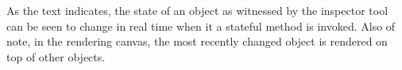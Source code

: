As the text indicates, the state of an object as witnessed by the
inspector tool can be seen to change in real time when it a stateful
method is invoked. Also of note, in the rendering canvas, the most
recently changed object is rendered on top of other objects.
